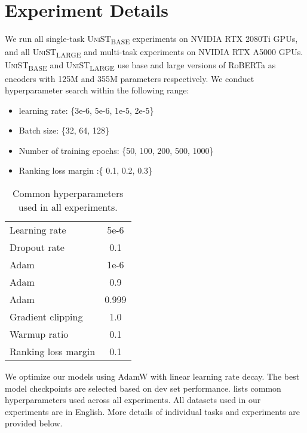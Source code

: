 \documentclass[11pt]{article}
\newcommand{\basemodel}{\textsc{UniST}\textsubscript{BASE}}
\newcommand{\largemodel}{\textsc{UniST}\textsubscript{LARGE}}
\begin{document}
\section{Experiment Details} \label{appendix}
We run all single-task \basemodel\xspace experiments on NVIDIA RTX 2080Ti GPUs, and all \largemodel\xspace and multi-task experiments on NVIDIA RTX A5000 GPUs. \basemodel\xspace and \largemodel\xspace use base and large versions of RoBERTa as encoders with 125M and 355M parameters respectively. We conduct hyperparameter search within the following range:
\begin{itemize}[leftmargin=*]
\setlength\itemsep{-0.1em}
    \item learning rate: \{3e-6, 5e-6, 1e-5, 2e-5\}
    \item Batch size: \{32, 64, 128\}
    \item Number of training epochs: \{50, 100, 200, 500, 1000\}
    \item Ranking loss margin :\{ 0.1, 0.2, 0.3\}
\end{itemize}
\begin{table}[ht]
    \centering
    \small
    \begin{tabular}{l|c}
        \toprule
        Learning rate & 5e-6 \\
        Dropout rate & 0.1 \\
        Adam  & 1e-6 \\
        Adam  & 0.9 \\
        Adam  & 0.999 \\
        Gradient clipping & 1.0 \\
        Warmup ratio & 0.1 \\
        Ranking loss margin & 0.1 \\
        \bottomrule
    \end{tabular}
    \caption{Common hyperparameters used in all experiments.} 
    \label{tab:comhyp}
\end{table} We optimize our models using AdamW \cite{loshchilov2018decoupled} with linear learning rate decay. The best model checkpoints are selected based on dev set performance.  lists common hyperparameters used across all experiments. All datasets used in our experiments are in English. More details of individual tasks and experiments are provided below.
\end{document}
